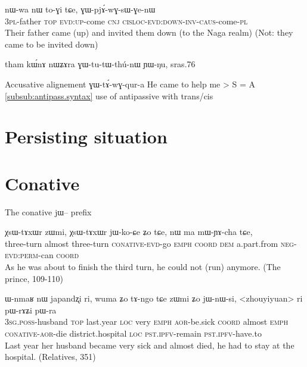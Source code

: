 \documentclass[oldfontcommands,oneside,a4paper,11pt]{memoir}
\newcommand{\ipa}[1]{{\phon #1}} %
\newcommand{\wav}[1]{}%
\begin{document}
\begin{exe}
\ex 
\gll nɯ-wa	nɯ	to-ɣi	tɕe,	ɣɯ-pjɤ́-wɣ-sɯ-ɣe-nɯ \\
3\textsc{pl}-father \textsc{top} \textsc{evd:up}-come \textsc{cnj} \textsc{cisloc}-\textsc{evd:down}-\textsc{inv}-\textsc{caus}-come-\textsc{pl} \\
\glt 	Their father came (up) and invited them down (to the Naga realm) (Not: they came to be invited down)
\end{exe}



tham kɯ́nɤ nɯʑɤra ɣɯ-tu-tɯ-thú-nɯ ɲɯ-ŋu,
sras.76

Accusative alignement
ɣɯ-tɤ́-wɣ-qur-a 
He came to help me > S = A \wav{8_GWtAwGqura}
\ref{subsub:antipass.syntax} use of antipassive with trans/cis


\section{Persisting situation}


\section{Conative}
The conative \ipa{jɯ}-- prefix

\citet{nigel13conative}

\begin{exe}
\ex
\gll 
\ipa{χsɯ-tɤxɯr}   	\ipa{zɯmi,}   	\ipa{χsɯ-tɤxɯr}   	\ipa{jɯ-ko-ɕe}   	\ipa{ʑo}   	   	\ipa{tɕe,}   	\ipa{nɯ}   	\ipa{ma}   	\ipa{mɯ-ɲɤ-cha}   	\ipa{tɕe,}   \\
three-turn almost three-turn \textsc{conative-evd}-go \textsc{emph} \textsc{coord} \textsc{dem} a.part.from \textsc{neg-evd:perm}-can \textsc{coord} \\
\glt As he was about to finish the third turn, he could not (run) anymore. (The prince, 109-110)
\end{exe}

\begin{exe}
\ex
\gll
\ipa{ɯ-nmaʁ}   	\ipa{nɯ}   	\ipa{japandʐi}   	\ipa{ri,}   	\ipa{wuma}   	\ipa{ʑo}   	\ipa{tɤ-ngo}   	\ipa{tɕe}   	\ipa{zɯmi}   	\ipa{ʑo}   	\ipa{jɯ-nɯ-si,}   	<zhouyiyuan>  	\ipa{ri}   	\ipa{pɯ-rɤʑi}   	\ipa{pɯ-ra}   \\
\textsc{3sg.poss}-husband \textsc{top} last.year \textsc{loc} very \textsc{emph} \textsc{aor}-be.sick \textsc{coord} almost \textsc{emph} \textsc{conative-aor}-die district.hospital \textsc{loc} \textsc{pst.ipfv}-remain \textsc{pst.ipfv}-have.to \\
\glt Last year her husband became very sick and almost died, he had to stay at the hospital. (Relatives, 351)
\end{exe}
\end{document}
